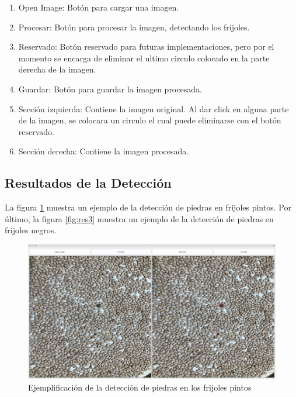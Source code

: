 \documentclass[conference]{IEEEtran}
\begin{document}
    \begin{enumerate}
        \item Open Image: Botón para cargar una imagen.
        \item Procesar: Botón para procesar la imagen, detectando los frijoles.
        \item Reservado: Botón reservado para futuras implementaciones, pero por el momento se encarga de eliminar el ultimo circulo colocado en la parte derecha de la imagen.
        \item Guardar: Botón para guardar la imagen procesada.
        \item Sección izquierda: Contiene la imagen original. Al dar click en alguna parte de la imagen, se colocara un circulo el cual puede eliminarse con el botón reservado.
        \item Sección derecha: Contiene la imagen procesada.
    \end{enumerate}


    \subsection{Resultados de la Detección}
    La figura \ref{fig:res2} muestra un ejemplo de la detección de piedras en frijoles pintos. Por último, la figura \ref{fig:res3} muestra un ejemplo de la detección de piedras en frijoles negros.

    \begin{figure}[H]
        \centering
        \includegraphics[width=\breite\linewidth]{images/pintos.png}
        \caption{Ejemplificación de la detección de piedras en los frijoles pintos}
        \label{fig:res2}
    \end{figure}
\end{document}
